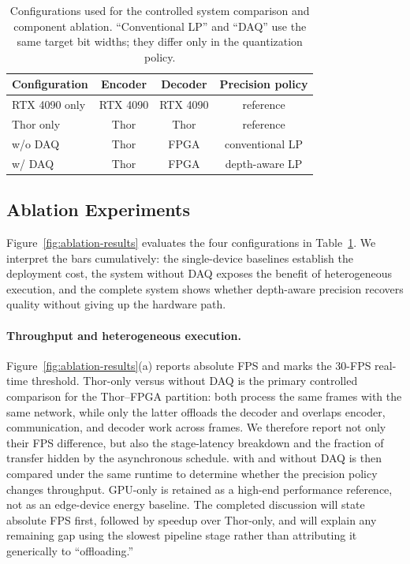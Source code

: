 \begin{table}[t]
  \caption{Configurations used for the controlled system comparison and
  component ablation.  ``Conventional LP'' and ``DAQ'' use the same target
  bit widths; they differ only in the quantization policy.}
  \label{tab:methodology}
  \centering
  \small
  \setlength{\tabcolsep}{3.0pt}
  \renewcommand{\arraystretch}{1.10}
  \begin{tabular}{lccc}
    \toprule
    Configuration & Encoder & Decoder & Precision policy \\
    \midrule
    RTX 4090 only & RTX 4090 & RTX 4090 & reference \\
    Thor only & Thor & Thor & reference \\
    \system{} w/o DAQ & Thor & FPGA & conventional LP \\
    \system{} w/ DAQ & Thor & FPGA & depth-aware LP \\
    \bottomrule
  \end{tabular}
\end{table}

\subsection{Ablation Experiments}

Figure~\ref{fig:ablation-results} evaluates the four configurations in
Table~\ref{tab:methodology}.  We interpret the bars cumulatively: the
single-device baselines establish the deployment cost, the system without DAQ
exposes the benefit of heterogeneous execution, and the complete system shows
whether depth-aware precision recovers quality without giving up the hardware
path.

\paragraph{Throughput and heterogeneous execution.}
Figure~\ref{fig:ablation-results}(a) reports absolute FPS and marks the 30-FPS
real-time threshold.  Thor-only versus \system{} without DAQ is the primary
controlled comparison for the Thor--FPGA partition: both process the same
frames with the same network, while only the latter offloads the decoder and
overlaps encoder, communication, and decoder work across frames.  We therefore
report not only their FPS difference, but also the stage-latency breakdown and
the fraction of transfer hidden by the asynchronous schedule.  \system{} with
and without DAQ is then compared under the same runtime to determine whether
the precision policy changes throughput.  GPU-only is retained as a high-end
performance reference, not as an edge-device energy baseline.  The completed
discussion will state absolute FPS first, followed by speedup over Thor-only,
and will explain any remaining gap using the slowest pipeline stage rather
than attributing it generically to ``offloading.''

